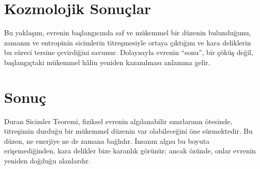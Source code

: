 \documentclass[12pt]{article}
\begin{document}
\section{Kozmolojik Sonuçlar}
Bu yaklaşım, evrenin başlangıcında saf ve mükemmel bir düzenin bulunduğunu, 
zamanın ve entropinin sicimlerin titreşmesiyle ortaya çıktığını ve 
kara deliklerin bu süreci tersine çevirdiğini savunur. 
Dolayısıyla evrenin “sonu”, bir çöküş değil, 
başlangıçtaki mükemmel hâlin yeniden kazanılması anlamına gelir.

\section{Sonuç}
Duran Sicimler Teoremi, fiziksel evrenin algılanabilir sınırlarının ötesinde, 
titreşimin durduğu bir mükemmel düzenin var olabileceğini öne sürmektedir. 
Bu düzen, ne enerjiye ne de zamana bağlıdır. 
İnsanın algısı bu boyuta erişemediğinden, kara delikler bize karanlık görünür; 
ancak özünde, onlar evrenin yeniden doğduğu alanlardır.
\end{document}
